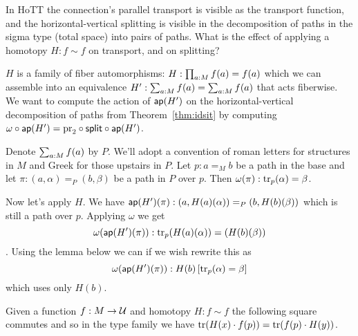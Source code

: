 In HoTT the connection's parallel transport is visible as the transport function, and the horizontal-vertical splitting is visible in the decomposition of paths in the sigma type (total space) into pairs of paths. What is the effect of applying a homotopy \( H:f\sim f \) on transport, and on splitting?

\( H \) is a family of fiber automorphisms: \( H:\prod_{a:M}f(a)=f(a) \) which we can assemble into an equivalence \( H':\sum_{a:M}f(a)=\sum_{a:M}f(a) \) that acts fiberwise. We want to compute the action of \( \mathsf{ap}(H') \) on the horizontal-vertical decomposition of paths from Theorem~\ref{thm:idsit} by computing \( \omega\circ\mathsf{ap}(H')=\mathrm{pr}_2\circ\mathsf{split}\circ\mathsf{ap}(H') \).

Denote \( \sum_{a:M}f(a) \) by \( P \). We'll adopt a convention of roman letters for structures in \( M \) and Greek for those upstairs in \( P \). Let \( p:a=_M b \) be a path in the base and let \( \pi:(a,\alpha)=_P (b,\beta) \) be a path in \( P \) over \( p \). Then \( \omega(\pi):\mathrm{tr}_p(\alpha)=\beta \).

Now let's apply \( H \). We have \( \mathsf{ap}(H')(\pi):(a,H(a)(\alpha))=_P(b,H(b)(\beta)) \) which is still a path over \( p \). Applying \( \omega \) we get \[ \omega(\mathsf{ap}(H')(\pi)):\mathrm{tr}_p(H(a)(\alpha))=(H(b)(\beta)) \]. Using the lemma below we can if we wish rewrite this as 
\[ 
\omega(\mathsf{ap}(H')(\pi)):H(b)\left[\mathrm{tr}_p(\alpha)=\beta\right]
\]
which uses only \( H(b) \).

\begin{mylemma}
Given a function \( f:M\to\mathcal{U} \) and homotopy \( H:f\sim f \) the following square commutes and so in the type family we have \( \mathrm{tr}(H(x)\cdot f(p)) = \mathrm{tr}(f(p)\cdot H(y)) \).
\end{mylemma}
\begin{center}
\end{center}


